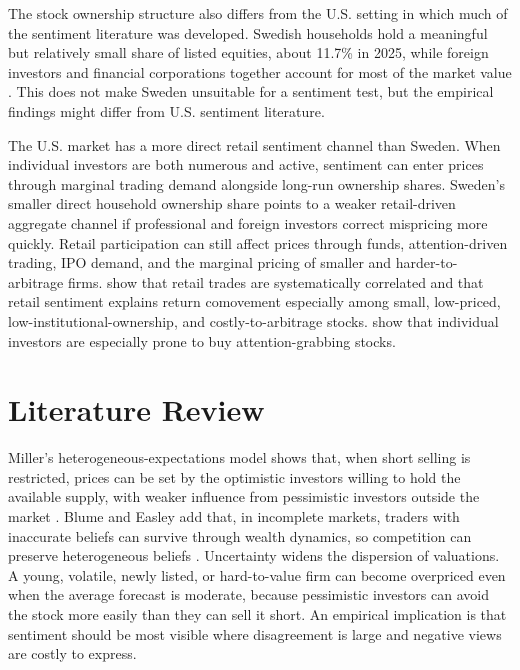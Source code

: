 \documentclass[11pt]{article}
\begin{document}
The stock ownership structure also differs from the U.S. setting in which much of the sentiment literature was developed. Swedish households hold a meaningful but relatively small share of listed equities, about 11.7\% in 2025, while foreign investors and financial corporations together account for most of the market value \citep{scb2026shareholders}. This does not make Sweden unsuitable for a sentiment test, but the empirical findings might differ from U.S. sentiment literature. 

The U.S. market has a more direct retail sentiment channel than Sweden. When individual investors are both numerous and active, sentiment can enter prices through marginal trading demand alongside long-run ownership shares. Sweden's smaller direct household ownership share points to a weaker retail-driven aggregate channel if professional and foreign investors correct mispricing more quickly. Retail participation can still affect prices through funds, attention-driven trading, IPO demand, and the marginal pricing of smaller and harder-to-arbitrage firms. \citet{kumar2006retail} show that retail trades are systematically correlated and that retail sentiment explains return comovement especially among small, low-priced, low-institutional-ownership, and costly-to-arbitrage stocks. \citet{barber2008glitters} show that individual investors are especially prone to buy attention-grabbing stocks.

\section{Literature Review}

Miller's heterogeneous-expectations model shows that, when short selling is restricted, prices can be set by the optimistic investors willing to hold the available supply, with weaker influence from pessimistic investors outside the market \citep{miller1977divergence}. Blume and Easley add that, in incomplete markets, traders with inaccurate beliefs can survive through wealth dynamics, so competition can preserve heterogeneous beliefs \citep{blume2006smart}. Uncertainty widens the dispersion of valuations. A young, volatile, newly listed, or hard-to-value firm can become overpriced even when the average forecast is moderate, because pessimistic investors can avoid the stock more easily than they can sell it short. An empirical implication is that sentiment should be most visible where disagreement is large and negative views are costly to express.
\end{document}
